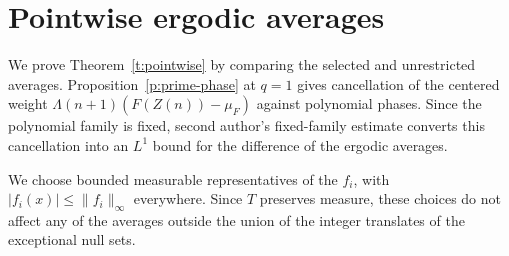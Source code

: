 \documentclass[12pt]{amsart}
\newcommand{\1}{\mathbf 1}
\newtheorem{theorem}{Theorem}[section]
\theoremstyle{definition}
\begin{document}


\section{Pointwise ergodic averages}\label{s:ergodic}

We prove Theorem~\ref{t:pointwise} by comparing the selected and
unrestricted averages. Proposition~\ref{p:prime-phase} at \(q=1\)
gives cancellation of the centered weight
\(\Lambda(n+1)(F(Z(n))-\mu_F)\) against polynomial phases.
Since the polynomial family is fixed, %
second author's
fixed-family estimate converts this cancellation into an
\(L^1\) bound for the difference of the ergodic averages.

We choose bounded measurable representatives of the $f_i$, with
$|f_i(x)|\leq\|f_i\|_\infty$ everywhere. Since $T$ preserves measure,
these choices do not affect any of the averages outside the union
of the integer translates of the exceptional null sets.
\end{document}

